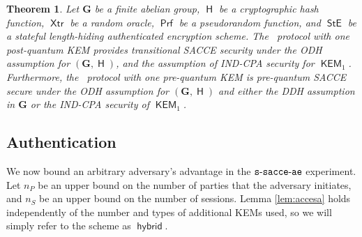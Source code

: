 \documentclass[USenglish,oneside,twocolumn]{article}
\theoremstyle{dgthm}
\newtheorem{theorem}{Theorem}[section]
\theoremstyle{dgdef}
\newcommand{\Protocol}[1]{\operatorname{\mathsf{#1}}}
\newcommand{\hybrid}{{\sf {hybrid}}}
\newcommand{\AlgorithmName}[1]{\operatorname{\mathsf{#1}}}
\newcommand{\Hash}{\AlgorithmName{H}}
\newcommand{\PRF}{\AlgorithmName{Prf}}
\newcommand{\XTR}{\AlgorithmName{Xtr}}
\newcommand{\STE}{\AlgorithmName{StE}}
\newcommand{\Experiment}[1]{\operatorname{\tt{#1}}}
\begin{document}
  \begin{theorem}\label{thm:hybrid}
    Let $\mathbf{G}$ be a finite abelian group, $\Hash$ be a cryptographic hash
    function, $\XTR$ be a random oracle, $\PRF$ be a pseudorandom function, and
    $\STE$ be a stateful length-hiding authenticated encryption scheme.  The
    \hybrid~protocol with one post-quantum KEM provides transitional SACCE
    security under the ODH assumption for $(\mathbf{G}, \Hash)$, and the
    assumption of IND-CPA security for $\AlgorithmName{KEM}_1$. Furthermore,
    the \hybrid~protocol with one pre-quantum KEM is pre-quantum SACCE secure
    under the ODH assumption for $(\mathbf{G}, \Hash)$ and \emph{either} the
    DDH assumption in $\mathbf{G}$ \emph{or} the IND-CPA security of
    $\AlgorithmName{KEM}_1$.
  \end{theorem}

  \subsection{Authentication}\label{sec:sacceauth}
We now bound an arbitrary adversary's advantage in the $\Experiment{s-sacce-ae}$ experiment.
Let $n_P$ be an upper bound on the number of parties that the adversary initiates, and
$n_S$ be an upper bound on the number of sessions.
Lemma \ref{lem:accesa} holds independently of the number and types of
additional KEMs used, so we will simply refer to the scheme as
$\Protocol{hybrid}$.
\end{document}
